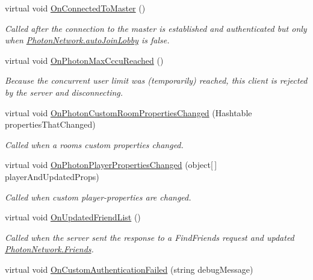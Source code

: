 \begin{DoxyCompactItemize}
virtual void \hyperlink{class_photon_1_1_pun_behaviour_ad77f0474fa75a37a3a39e96aa386ab09}{On\+Connected\+To\+Master} ()
\begin{DoxyCompactList}\small\item\em Called after the connection to the master is established and authenticated but only when \hyperlink{class_photon_network_ad534d4da7222bd8a6d8423cbd238d7f4}{Photon\+Network.\+auto\+Join\+Lobby} is false. \end{DoxyCompactList}\item 
virtual void \hyperlink{class_photon_1_1_pun_behaviour_adcef9694244295ad493bc4ec0b4463d4}{On\+Photon\+Max\+Cccu\+Reached} ()
\begin{DoxyCompactList}\small\item\em Because the concurrent user limit was (temporarily) reached, this client is rejected by the server and disconnecting. \end{DoxyCompactList}\item 
virtual void \hyperlink{class_photon_1_1_pun_behaviour_abf25d63a39ef13cb9a0519e6e7672a2f}{On\+Photon\+Custom\+Room\+Properties\+Changed} (Hashtable properties\+That\+Changed)
\begin{DoxyCompactList}\small\item\em Called when a room\textquotesingle{}s custom properties changed. \end{DoxyCompactList}\item 
virtual void \hyperlink{class_photon_1_1_pun_behaviour_aaec2f5973228b99c6ad781d5cedadb6f}{On\+Photon\+Player\+Properties\+Changed} (object\mbox{[}$\,$\mbox{]} player\+And\+Updated\+Props)
\begin{DoxyCompactList}\small\item\em Called when custom player-\/properties are changed. \end{DoxyCompactList}\item 
virtual void \hyperlink{class_photon_1_1_pun_behaviour_a443380e89534a70dfe4ce7ca16083035}{On\+Updated\+Friend\+List} ()
\begin{DoxyCompactList}\small\item\em Called when the server sent the response to a Find\+Friends request and updated \hyperlink{class_photon_network_afd22fd553d52fdc63e975c32ea47514f}{Photon\+Network.\+Friends}. \end{DoxyCompactList}\item 
virtual void \hyperlink{class_photon_1_1_pun_behaviour_ade038a534b66b6d9a5faad53e21e22c9}{On\+Custom\+Authentication\+Failed} (string debug\+Message)

\end{DoxyCompactItemize}
